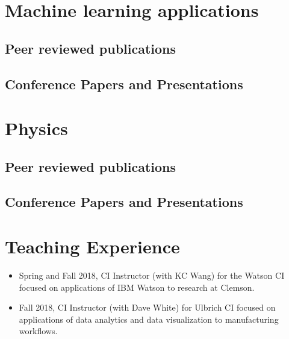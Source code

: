 \documentclass[12pt,letterpaper,roman]{moderncv}        %
\begin{document}

\section{Machine learning applications}

\subsection{Peer reviewed publications}

\begin{refsection}
  \nocite{*}
  \printbibliography[heading=none]
\end{refsection}

\subsection{Conference Papers and Presentations}

\begin{refsection}
  \nocite{*}
  \printbibliography[heading=none]
\end{refsection}

\section{Physics}
\subsection{Peer reviewed publications}
\begin{refsection}
  \nocite{*}
  \printbibliography[heading=none]
\end{refsection}

\subsection{Conference Papers and Presentations}

\begin{refsection}
  \nocite{*}
  \printbibliography[heading=none]
\end{refsection}
      
\section{Teaching Experience}
{
  \begin{itemize}
  \item Spring and Fall 2018, CI Instructor (with KC Wang) for the Watson CI focused on applications of IBM Watson to research at Clemson.
  \item Fall 2018, CI Instructor (with Dave White) for Ulbrich CI focused on applications of data analytics and data visualization to manufacturing workflows.
    \end{itemize}
  }
\end{document}
